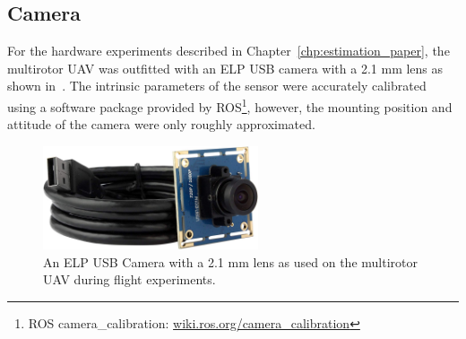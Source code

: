 \subsection{Camera}
For the hardware experiments described in Chapter~\ref{chp:estimation_paper},
the multirotor UAV was outfitted with an ELP USB camera with a 2.1 mm lens as
shown in~. The intrinsic parameters of the sensor were
accurately calibrated using a software package provided by ROS\footnote{ROS
camera\_calibration: \href{wiki.ros.org/camera_calibration}{wiki.ros.org/camera\_calibration}},
however, the mounting position and attitude of the camera were only roughly
approximated.

\begin{figure}[h]
  \centering
  \includegraphics[width=2.5in]{figures/camera.jpg}
  \caption[ELP USB Camera with 2.1 mm Lens]{An ELP USB Camera with a 2.1 mm
  lens as used on the multirotor UAV during flight experiments.}
%
  \label{fig:camera}
\end{figure}

